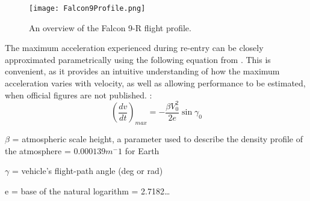 \begin{figure}[!htb] 
    \centering
    \texttt{[image: Falcon9Profile.png]} 
    \caption{An overview of the Falcon 9-R flight profile.}
    \label{fig:Falcon9Profile}
\end{figure}


The maximum acceleration experienced during re-entry can be closely approximated parametrically using the following equation from \cite{eastre}. This is convenient, as it provides an intuitive understanding of how the maximum acceleration varies with velocity, as well as allowing performance to be estimated, when official figures are not published. : 
$$(\frac{dv}{dt})_{max} = -\frac{\beta V_0 ^2}{2e} \sin \gamma_0$$

$\beta$ = atmospheric scale height, a parameter used to describe the density profile of the atmosphere = $0.000139 m^-1$ for Earth

$\gamma$ = vehicle's flight-path angle (deg or rad)

e = base of the natural logarithm = 2.7182\ldots
